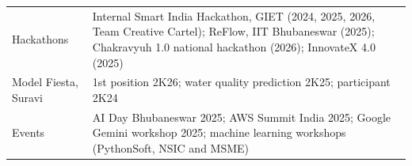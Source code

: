 
\vspace{2pt}
\begin{tabularx}{\textwidth}{LX}
Hackathons & Internal Smart India Hackathon, GIET (2024, 2025, 2026, Team Creative Cartel); ReFlow, IIT Bhubaneswar (2025); Chakravyuh 1.0 national hackathon (2026); InnovateX 4.0 (2025) \\
Model Fiesta, Suravi & 1st position 2K26; water quality prediction 2K25; participant 2K24 \\
Events & AI Day Bhubaneswar 2025; AWS Summit India 2025; Google Gemini workshop 2025; machine learning workshops (PythonSoft, NSIC and MSME) \\
\end{tabularx}
